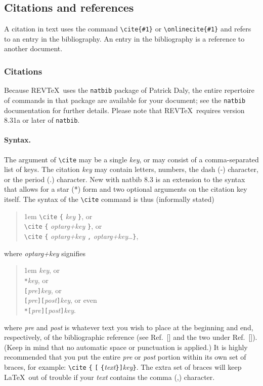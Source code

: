\documentclass[%
 preprint, linenumbers,
 amsmath,amssymb,
 aps, physrev,
pra,
]{revtex4-2}
\begin{document}
\subsection{\label{sec:citeref}Citations and references}
A citation in text uses the command \verb+\cite{#1}+ or
\verb+\onlinecite{#1}+ and refers to an entry in the bibliography. 
An entry in the bibliography is a reference to another document.

\subsubsection{Citations}
Because REV\TeX\ uses the \verb+natbib+ package of Patrick Daly, 
the entire repertoire of commands in that package are available for your document;
see the \verb+natbib+ documentation for further details. Please note that
REV\TeX\ requires version 8.31a or later of \verb+natbib+.

\paragraph{Syntax.}
The argument of \verb+\cite+ may be a single \emph{key}, 
or may consist of a comma-separated list of keys.
The citation \emph{key} may contain 
letters, numbers, the dash (-) character, or the period (.) character. 
New with natbib 8.3 is an extension to the syntax that allows for 
a star (*) form and two optional arguments on the citation key itself.
The syntax of the \verb+\cite+ command is thus (informally stated)
\begin{quotation}\flushleft\leftskip1em
\verb+\cite+ \verb+{+ \emph{key} \verb+}+, or\\
\verb+\cite+ \verb+{+ \emph{optarg+key} \verb+}+, or\\
\verb+\cite+ \verb+{+ \emph{optarg+key} \verb+,+ \emph{optarg+key}\ldots \verb+}+,
\end{quotation}\noindent
where \emph{optarg+key} signifies 
\begin{quotation}\flushleft\leftskip1em
\emph{key}, or\\
\texttt{*}\emph{key}, or\\
\texttt{[}\emph{pre}\texttt{]}\emph{key}, or\\
\texttt{[}\emph{pre}\texttt{]}\texttt{[}\emph{post}\texttt{]}\emph{key}, or even\\
\texttt{*}\texttt{[}\emph{pre}\texttt{]}\texttt{[}\emph{post}\texttt{]}\emph{key}.
\end{quotation}\noindent
where \emph{pre} and \emph{post} is whatever text you wish to place 
at the beginning and end, respectively, of the bibliographic reference
(see Ref.~[] and the two under Ref.~[]).
(Keep in mind that no automatic space or punctuation is applied.)
It is highly recommended that you put the entire \emph{pre} or \emph{post} portion 
within its own set of braces, for example: 
\verb+\cite+ \verb+{+ \texttt{[} \verb+{+\emph{text}\verb+}+\texttt{]}\emph{key}\verb+}+.
The extra set of braces will keep \LaTeX\ out of trouble if your \emph{text} contains the comma (,) character.
\end{document}
